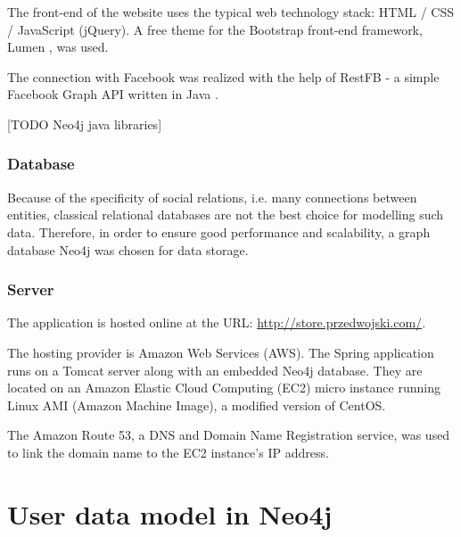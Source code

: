 \documentclass[12pt]{report}
\begin{document}
The front-end of the website uses the typical web technology stack: HTML / CSS / JavaScript (jQuery). A free theme for the Bootstrap front-end framework, Lumen \cite{lumen}, was used.

The connection with Facebook was realized with the help of RestFB - a simple Facebook Graph API written in Java \cite{restfb}.

\hbox{}
[TODO Neo4j java libraries]

\subsubsection{Database}

Because of the specificity of social relations, i.e. many connections between entities, classical relational databases are not the best choice for modelling such data. Therefore, in order to ensure good performance and scalability, a graph database Neo4j \cite{neo4j} was chosen for data storage.

\subsubsection{Server}

The application is hosted online at the URL: \url{http://store.przedwojski.com/}. 

The hosting provider is Amazon Web Services (AWS). The Spring application runs on a Tomcat server along with an embedded Neo4j database. They are located on an Amazon Elastic Cloud Computing (EC2) micro instance running Linux AMI (Amazon Machine Image), a modified version of CentOS.

The Amazon Route 53, a DNS and Domain Name Registration service, was used to link the domain name to the EC2 instance's IP address.








\section{User data model in Neo4j}
\end{document}
